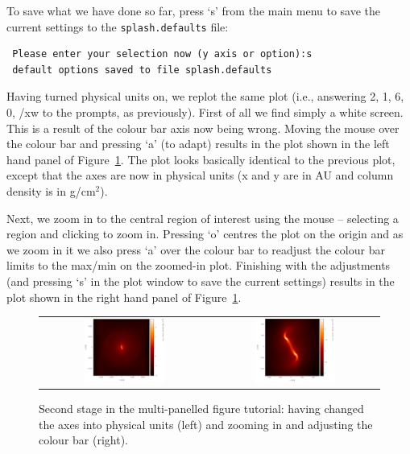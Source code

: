 \documentclass[a4paper,10pt]{article}
\begin{document}
 To save what we have done so far, press `s' from the main menu to save the current settings to the \verb+splash.defaults+ file:
\begin{verbatim}
 Please enter your selection now (y axis or option):s
 default options saved to file splash.defaults
\end{verbatim}

 Having turned physical units on, we replot the same plot (i.e., answering 2, 1, 6, 0, /xw to the prompts, as previously). First of all we find simply a white screen. This is a result of the colour bar axis now being wrong. Moving the mouse over the colour bar and pressing `a' (to adapt) results in the plot shown in the left hand panel of Figure~\ref{fig:multipart3}. The plot looks basically identical to the previous plot, except that the axes are now in physical units (x and y are in AU and column density is in g/cm$^{2}$). 

Next, we zoom in to the central region of interest using the mouse -- selecting a region and clicking to zoom in. Pressing `o' centres the plot on the origin and as we zoom in it we also press `a' over the colour bar to readjust the colour bar limits to the max/min on the zoomed-in plot. Finishing with the adjustments (and pressing `s' in the plot window to save the current settings) results in the plot shown in the right hand panel of Figure~\ref{fig:multipart3}.
\begin{figure}[h]
\begin{center}
\begin{tabular}{cc}
\includegraphics[width=0.5\textwidth]{multipart3.png} &
\includegraphics[width=0.5\textwidth]{multipart4.png}
\end{tabular}
\caption{Second stage in the multi-panelled figure tutorial: having changed the axes into physical units (left) and zooming in and adjusting the colour bar (right).}
\label{fig:multipart3}
\end{center}
\end{figure}
\end{document}
